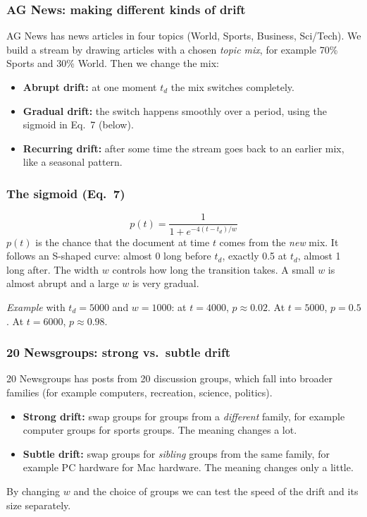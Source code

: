 \documentclass[11pt,a4paper]{article}
\begin{document}
\subsubsection*{AG News: making different kinds of drift}
AG News has news articles in four topics (World, Sports, Business, Sci/Tech). We build a stream by drawing articles with a chosen \emph{topic mix}, for example 70\% Sports and 30\% World. Then we change the mix:
\begin{itemize}
\item \textbf{Abrupt drift:} at one moment $t_d$ the mix switches completely.
\item \textbf{Gradual drift:} the switch happens smoothly over a period, using the sigmoid in Eq.~7 (below).
\item \textbf{Recurring drift:} after some time the stream goes back to an earlier mix, like a seasonal pattern.
\end{itemize}

\subsubsection*{The sigmoid (Eq.~7)}
\[
p(t)=\frac{1}{1+e^{-4(t-t_d)/w}}
\]
$p(t)$ is the chance that the document at time $t$ comes from the \emph{new} mix. It follows an S-shaped curve: almost 0 long before $t_d$, exactly 0.5 at $t_d$, almost 1 long after. The width $w$ controls how long the transition takes. A small $w$ is almost abrupt and a large $w$ is very gradual.

\emph{Example} with $t_d=5000$ and $w=1000$: at $t=4000$, $p\approx0.02$. At $t=5000$, $p=0.5$. At $t=6000$, $p\approx0.98$.

\subsubsection*{20 Newsgroups: strong vs.\ subtle drift}
20 Newsgroups has posts from 20 discussion groups, which fall into broader families (for example computers, recreation, science, politics).
\begin{itemize}
\item \textbf{Strong drift:} swap groups for groups from a \emph{different} family, for example computer groups for sports groups. The meaning changes a lot.
\item \textbf{Subtle drift:} swap groups for \emph{sibling} groups from the same family, for example PC hardware for Mac hardware. The meaning changes only a little.
\end{itemize}
By changing $w$ and the choice of groups we can test the speed of the drift and its size separately.
\end{document}
